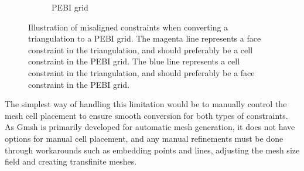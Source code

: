 \begin{figure}[ht]
\begin{subfigure}[b]{0.45\textwidth}
        \caption{PEBI grid}
        \label{fig:limitation-pebi}
    \end{subfigure}
    \caption[Misaligned constraints when converting triangulation to PEBI grid]{Illustration of misaligned constraints when converting a triangulation to a PEBI grid. The magenta line represents a face constraint in the triangulation, and should preferably be a cell constraint in the PEBI grid. The blue line represents a cell constraint in the triangulation, and should preferably be a face constraint in the PEBI grid.}
    \label{fig:triangulation-to-PEBI-limitation}
\end{figure}

The simplest way of handling this limitation would be to manually control the mesh cell placement to ensure smooth conversion for both types of constraints. As Gmsh is primarily developed for automatic mesh generation, it does not have options for manual cell placement, and any manual refinements must be done through workarounds such as embedding points and lines, adjusting the mesh size field and creating transfinite meshes.
